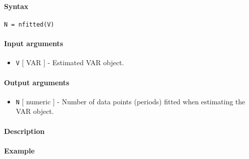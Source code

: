 


	\paragraph{Syntax}\label{syntax}

\begin{verbatim}
N = nfitted(V)
\end{verbatim}

\paragraph{Input arguments}\label{input-arguments}

\begin{itemize}
\itemsep1pt\parskip0pt
\item
  \texttt{V} {[} VAR {]} - Estimated VAR object.
\end{itemize}

\paragraph{Output arguments}\label{output-arguments}

\begin{itemize}
\itemsep1pt\parskip0pt
\item
  \texttt{N} {[} numeric {]} - Number of data points (periods) fitted
  when estimating the VAR object.
\end{itemize}

\paragraph{Description}\label{description}

\paragraph{Example}\label{example}


